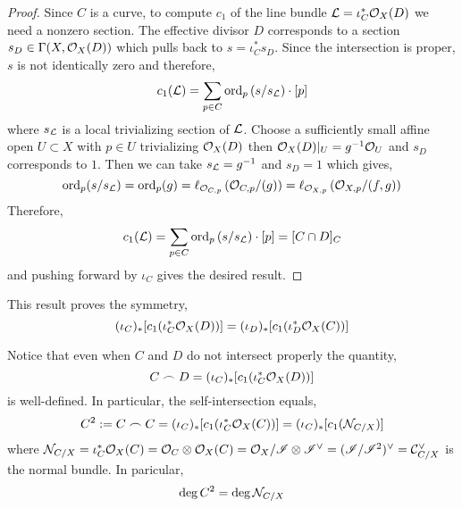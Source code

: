\documentclass[12pt]{article}
\begin{document}
\begin{proof}
Since $C$ is a curve, to compute $c_1$ of the line bundle $\mathcal{L} = \iota^*_C \mathcal{O}_{X}(D)$ we need a nonzero section. The effective divisor $D$ corresponds to a section $s_D \in \Gamma(X, \mathcal{O}_{X}(D))$ which pulls back to $s = \iota_C^* s_D$. Since the intersection is proper, $s$ is not identically zero and therefore, 
\[ c_1(\mathcal{L}) = \sum_{p \in C} \mathrm{ord}_{p} \left( s / s_{\mathcal{L}} \right) \cdot [p] \]
where $s_{\mathcal{L}}$ is a local trivializing section of $\mathcal{L}$. Choose a sufficiently small affine open $U \subset X$ with $p \in U$ trivializing $\mathcal{O}_{X}(D)$ then $\mathcal{O}_{X}(D)|_U = g^{-1} \mathcal{O}_{U}$ and $s_D$ corresponds to $1$. Then we can take $s_{\mathcal{L}} = g^{-1}$ and $s_D = 1$ which gives,
\[ \mathrm{ord}_p(s / s_{\mathcal{L}}) = \mathrm{ord}_p(g) = \ell_{\mathcal{O}_{C, p}} \left( \mathcal{O}_{C, p}/(g) \right) = \ell_{\mathcal{O}_{X, p}} \left( \mathcal{O}_{X, p} / (f, g) \right) \]
Therefore,
\[ c_1(\mathcal{L}) = \sum_{p \in C} \mathrm{ord}_{p} \left( s / s_{\mathcal{L}} \right) \cdot [p] = [C \cap D]_C \]
and pushing forward by $\iota_C$ gives the desired result.
\end{proof}

\begin{rmk}
This result proves the symmetry,
\[ (\iota_C)_* [c_1( \iota_C^* \mathcal{O}_{X}(D) )] = (\iota_D)_* [c_1( \iota_D^* \mathcal{O}_{X}(C) )] \]
\end{rmk}

\begin{rmk}
Notice that even when $C$ and $D$ do not intersect properly the quantity,
\[ C \frown D = (\iota_C)_* [c_1(\iota_C^* \mathcal{O}_{X}(D))] \]
is well-defined. In particular, the self-intersection equals,
\[ C^2 := C \frown C = (\iota_C)_* [c_1 (\iota_C^* \mathcal{O}_{X}(C))] = (\iota_C)_* [c_1(\mathcal{N}_{C/X})] \]
where $\mathcal{N}_{C/X} = \iota_C^* \mathcal{O}_{X}(C) = \mathcal{O}_{C} \otimes \mathcal{O}_{X}(C) = \mathcal{O}_{X} / \mathscr{I} \otimes \mathscr{I}^\vee = (\mathscr{I} / \mathscr{I}^2)^\vee = \mathcal{C}_{C/X}^\vee$ is the normal bundle. In paricular,
\[ \deg{C^2} = \deg{\mathcal{N}_{C/X}} \] 
\end{rmk}
\end{document}
